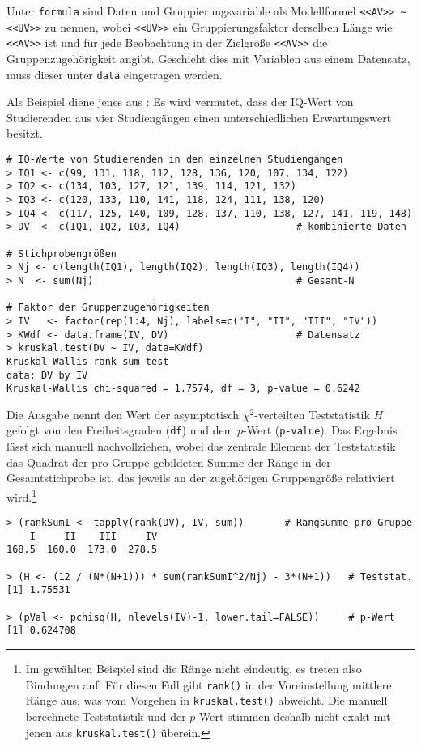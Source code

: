 Unter \lstinline!formula! sind Daten und Gruppierungsvariable als Modellformel \lstinline!<<AV>> ~ <<UV>>! zu nennen, wobei \lstinline!<<UV>>! ein Gruppierungsfaktor derselben Länge wie \lstinline!<<AV>>! ist und für jede Beobachtung in der Zielgröße \lstinline!<<AV>>! die Gruppenzugehörigkeit angibt. Geschieht dies mit Variablen aus einem Datensatz, muss dieser unter \lstinline!data! eingetragen werden.

Als Beispiel diene jenes aus : Es wird vermutet, dass der IQ-Wert von Studierenden aus vier Studiengängen einen unterschiedlichen Erwartungswert besitzt.
\begin{lstlisting}
# IQ-Werte von Studierenden in den einzelnen Studiengängen
> IQ1 <- c(99, 131, 118, 112, 128, 136, 120, 107, 134, 122)
> IQ2 <- c(134, 103, 127, 121, 139, 114, 121, 132)
> IQ3 <- c(120, 133, 110, 141, 118, 124, 111, 138, 120)
> IQ4 <- c(117, 125, 140, 109, 128, 137, 110, 138, 127, 141, 119, 148)
> DV  <- c(IQ1, IQ2, IQ3, IQ4)                    # kombinierte Daten

# Stichprobengrößen
> Nj <- c(length(IQ1), length(IQ2), length(IQ3), length(IQ4))
> N  <- sum(Nj)                                   # Gesamt-N

# Faktor der Gruppenzugehörigkeiten
> IV   <- factor(rep(1:4, Nj), labels=c("I", "II", "III", "IV"))
> KWdf <- data.frame(IV, DV)                      # Datensatz
> kruskal.test(DV ~ IV, data=KWdf)
Kruskal-Wallis rank sum test
data: DV by IV
Kruskal-Wallis chi-squared = 1.7574, df = 3, p-value = 0.6242
\end{lstlisting}

Die Ausgabe nennt den Wert der asymptotisch $\chi^{2}$-verteilten Teststatistik $H$ gefolgt von den Freiheitsgraden (\lstinline!df!) und dem $p$-Wert (\lstinline!p-value!). Das Ergebnis lässt sich manuell nachvollziehen, wobei das zentrale Element der Teststatistik das Quadrat der pro Gruppe gebildeten Summe der Ränge in der Gesamtstichprobe ist, das jeweils an der zugehörigen Gruppengröße relativiert wird.\footnote{Im gewählten Beispiel sind die Ränge nicht eindeutig, es treten also Bindungen auf. Für diesen Fall gibt \lstinline!rank()! in der Voreinstellung mittlere Ränge aus, was vom Vorgehen in \lstinline!kruskal.test()! abweicht. Die manuell berechnete Teststatistik und der $p$-Wert stimmen deshalb nicht exakt mit jenen aus \lstinline!kruskal.test()! überein.}
\begin{lstlisting}
> (rankSumI <- tapply(rank(DV), IV, sum))       # Rangsumme pro Gruppe
    I     II    III     IV
168.5  160.0  173.0  278.5

> (H <- (12 / (N*(N+1))) * sum(rankSumI^2/Nj) - 3*(N+1))   # Teststat.
[1] 1.75531

> (pVal <- pchisq(H, nlevels(IV)-1, lower.tail=FALSE))     # p-Wert
[1] 0.624708
\end{lstlisting}

